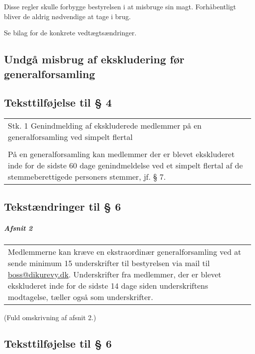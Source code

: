 \documentclass[a4paper,11pt]{report}
\newenvironment{quotationb}%
{\begin{tabular}{|p{10cm}}}%
{\\\end{tabular}}
\begin{document}
Disse regler skulle forbygge bestyrelsen i at misbruge sin magt.  Forhåbentligt
bliver de aldrig nødvendige at tage i brug.

Se bilag for de konkrete vedtægtsændringer.

\begin{appendices}

\chapter{Undgå misbrug af ekskludering før generalforsamling}

\section*{Teksttilføjelse til § 4}

\begin{quotationb}
Stk. 1 Genindmelding af ekskluderede medlemmer på en generalforsamling ved
simpelt flertal\\
\\
På en generalforsamling kan medlemmer der er blevet ekskluderet inde for de
sidste 60 dage genindmeldelse ved et simpelt flertal af de stemmeberettigede
personers stemmer, jf. § 7.
\end{quotationb}

\section*{Tekstændringer til § 6}

\paragraph{Afsnit 2}

\begin{quotationb}
Medlemmerne kan kræve en ekstraordinær generalforsamling ved at sende
minimum 15 underskrifter til bestyrelsen via mail til \url{boss@dikurevy.dk}.
Underskrifter fra medlemmer, der er blevet ekskluderet inde for de sidste 14
dage siden underskriftens modtagelse, tæller også som underskrifter.
\end{quotationb}

\setlength{\parskip}{15pt}
(Fuld omskrivning af afsnit 2.)
\setlength{\parskip}{0pt}

\section*{Teksttilføjelse til § 6}


\end{appendices}
\end{document}
